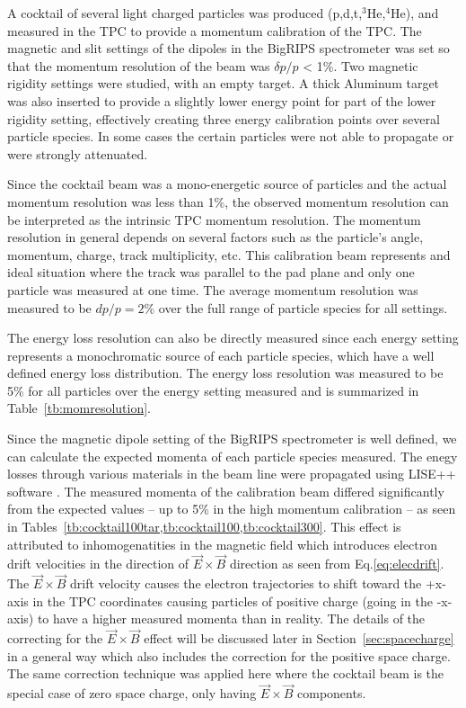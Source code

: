 A cocktail of several light charged particles was produced (p,d,t,${}^{3}$He,${}^{4}$He), and measured in the TPC to provide a momentum calibration of the TPC. The magnetic and slit settings of the dipoles in the BigRIPS spectrometer was set so that the momentum resolution of the beam was $\delta p/p$ < 1\%. Two magnetic rigidity settings were studied, with an empty target. A thick Aluminum target was also inserted to provide a slightly lower energy point for part of the lower rigidity setting, effectively creating three energy calibration points over several particle species. In some cases the certain particles were not able to propagate or were strongly attenuated. 

Since the cocktail beam was a mono-energetic source of particles and the actual momentum resolution was less than 1\%, the observed momentum resolution can be interpreted as the intrinsic TPC momentum resolution. The momentum resolution in general depends on several factors such as the particle's angle, momentum, charge, track multiplicity, etc. This calibration beam represents and ideal situation where the track was parallel to the pad plane and only one particle was measured at one time. The average momentum resolution was measured to be $dp/p = 2\%$ over the full range of particle species for all settings. 

The energy loss resolution can also be directly measured since each energy setting represents a monochromatic source of each particle species, which have a well defined energy loss distribution. The energy loss resolution was measured to be 5\% for all particles over the energy setting measured and is summarized in Table~\ref{tb:momresolution}.

Since the magnetic dipole setting of the BigRIPS spectrometer is well defined, we can calculate the expected momenta of each particle species measured. The enegy losses through various materials in the beam line were propagated using LISE++ software \cite{lise++}. The measured momenta of the calibration beam differed significantly from the expected values -- up to 5\% in the high momentum calibration -- as seen in Tables~\cref{tb:cocktail100tar,tb:cocktail100,tb:cocktail300}. This effect is attributed to inhomogenatities in the magnetic field which introduces electron drift velocities in the direction of $\vec{E}\times\vec{B}$ direction as seen from Eq.\ref{eq:elecdrift}. The $\vec{E}\times\vec{B}$ drift velocity causes the electron trajectories to shift toward the +x-axis in the TPC coordinates causing particles of positive charge (going in the -x-axis) to have a higher measured momenta than in reality.  The details of the correcting for the $\vec{E}\times\vec{B}$ effect will be discussed later in Section~\ref{sec:spacecharge} in a  general way which also includes the correction for the positive space charge. The same correction technique was applied here where the cocktail beam is the special case of zero space charge, only having $\vec{E}\times\vec{B}$ components.

